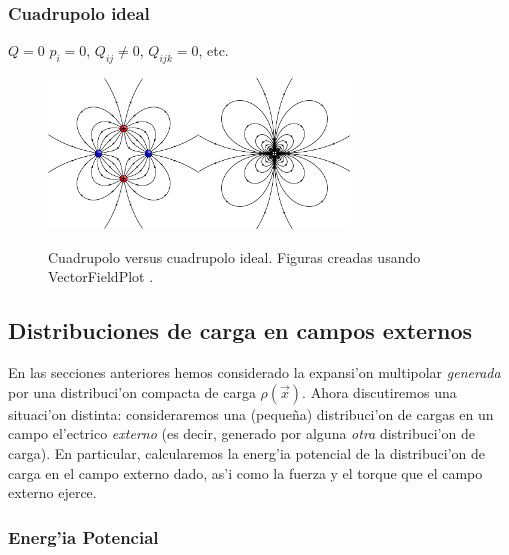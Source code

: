 \subsubsection{Cuadrupolo ideal}
$Q=0$ $p_i=0$, $Q_{ij}\neq 0$, $Q_{ijk}=0$, etc.

\begin{figure}[H]
\begin{center}
\includegraphics[height=4cm]{fig/fig-E-03.pdf}\hspace{1cm}\includegraphics[height=4cm]{fig/fig-campo-cuadrupolo-electrico-ideal.pdf} 
\caption{Cuadrupolo versus cuadrupolo ideal. Figuras creadas usando VectorFieldPlot \cite{VFP}.}
\label{fig-dipolos2}
\end{center}
\end{figure}
\newpage


\subsection{Distribuciones de carga en campos externos} \label{ed3_3}

En las secciones anteriores hemos considerado la expansi'on multipolar
\textit{generada} por una distribuci'on compacta de carga
$\rho(\vec{x})$. Ahora discutiremos una situaci'on distinta: consideraremos
una (peque\~na) distribuci'on de cargas en un campo el'ectrico
\textit{externo} (es decir, generado por alguna \textit{otra} distribuci'on de
carga). En particular, calcularemos la energ'ia potencial de la
distribuci'on de carga en el campo externo dado, as'i como la fuerza y el
torque que el campo externo ejerce.

\subsubsection{Energ'ia Potencial} \label{ed3_3_1}


